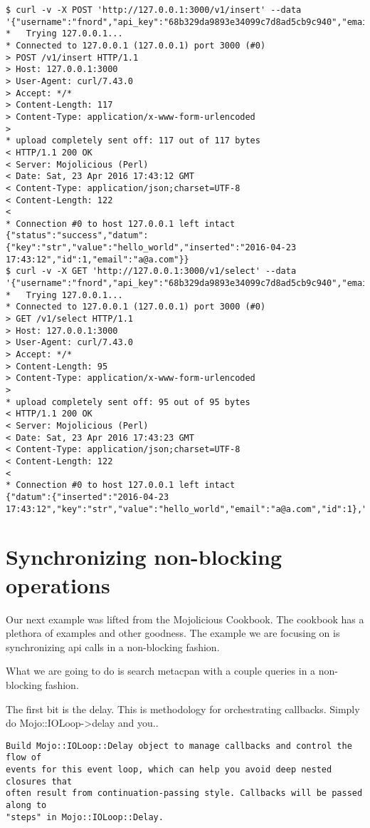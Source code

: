 \documentclass[14pt]{extreport}
\begin{document}
\begin{lstlisting}[style=BashOutputStyle]
$ curl -v -X POST 'http://127.0.0.1:3000/v1/insert' --data '{"username":"fnord","api_key":"68b329da9893e34099c7d8ad5cb9c940","email":"a@a.com","key":"str","value":"hello_world"}'
*   Trying 127.0.0.1...
* Connected to 127.0.0.1 (127.0.0.1) port 3000 (#0)
> POST /v1/insert HTTP/1.1
> Host: 127.0.0.1:3000
> User-Agent: curl/7.43.0
> Accept: */*
> Content-Length: 117
> Content-Type: application/x-www-form-urlencoded
> 
* upload completely sent off: 117 out of 117 bytes
< HTTP/1.1 200 OK
< Server: Mojolicious (Perl)
< Date: Sat, 23 Apr 2016 17:43:12 GMT
< Content-Type: application/json;charset=UTF-8
< Content-Length: 122
< 
* Connection #0 to host 127.0.0.1 left intact
{"status":"success","datum":{"key":"str","value":"hello_world","inserted":"2016-04-23 17:43:12","id":1,"email":"a@a.com"}}
$ curl -v -X GET 'http://127.0.0.1:3000/v1/select' --data '{"username":"fnord","api_key":"68b329da9893e34099c7d8ad5cb9c940","email":"a@a.com","key":"str"}'
*   Trying 127.0.0.1...
* Connected to 127.0.0.1 (127.0.0.1) port 3000 (#0)
> GET /v1/select HTTP/1.1
> Host: 127.0.0.1:3000
> User-Agent: curl/7.43.0
> Accept: */*
> Content-Length: 95
> Content-Type: application/x-www-form-urlencoded
> 
* upload completely sent off: 95 out of 95 bytes
< HTTP/1.1 200 OK
< Server: Mojolicious (Perl)
< Date: Sat, 23 Apr 2016 17:43:23 GMT
< Content-Type: application/json;charset=UTF-8
< Content-Length: 122
< 
* Connection #0 to host 127.0.0.1 left intact
{"datum":{"inserted":"2016-04-23 17:43:12","key":"str","value":"hello_world","email":"a@a.com","id":1},"status":"success"}
\end{lstlisting}

\section{Synchronizing non-blocking operations}

Our next example was lifted from the Mojolicious Cookbook.  The cookbook has a
plethora of examples and other goodness.  The example we are focusing on is
synchronizing api calls in a non-blocking fashion.

What we are going to do is search metacpan with a couple queries in a
non-blocking fashion.

The first bit is the delay.  This is methodology for orchestrating callbacks.  Simply do
Mojo::IOLoop->delay and you..

\begin{lstlisting}[style=BlockStyle]
Build Mojo::IOLoop::Delay object to manage callbacks and control the flow of
events for this event loop, which can help you avoid deep nested closures that
often result from continuation-passing style. Callbacks will be passed along to
"steps" in Mojo::IOLoop::Delay.
\end{lstlisting}
\end{document}
